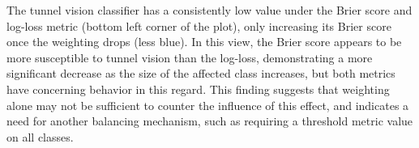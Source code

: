 

The tunnel vision classifier has a consistently low value under the Brier score and log-loss metric (bottom left corner of the plot), only increasing its Brier score once the weighting drops (less blue).
In this view, the Brier score appears to be more susceptible to tunnel vision than the log-loss, demonstrating a more significant decrease as the size of the affected class increases, but both metrics have concerning behavior in this regard.
This finding suggests that weighting alone may not be sufficient to counter the influence of this effect, and indicates a need for another balancing mechanism, such as requiring a threshold metric value on all classes.

